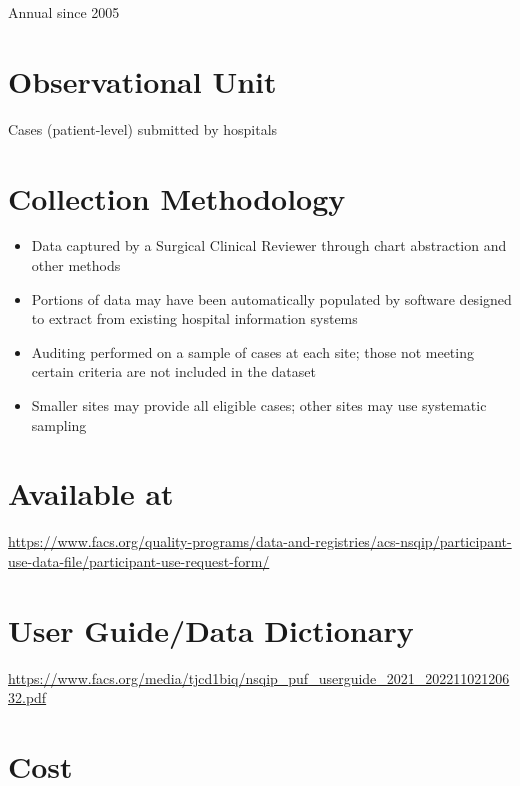 \documentclass[
]{book}
\providecommand{\tightlist}{%
  \setlength{\itemsep}{0pt}\setlength{\parskip}{0pt}}
\begin{document}
Annual since 2005

\hypertarget{observational-unit-3}{%
\section{Observational Unit}\label{observational-unit-3}}

Cases (patient-level) submitted by hospitals

\hypertarget{collection-methodology-3}{%
\section{Collection Methodology}\label{collection-methodology-3}}

\begin{itemize}
\tightlist
\item
  Data captured by a Surgical Clinical Reviewer through chart abstraction and other methods
\item
  Portions of data may have been automatically populated by software designed to extract from existing hospital information systems
\item
  Auditing performed on a sample of cases at each site; those not meeting certain criteria are not included in the dataset
\item
  Smaller sites may provide all eligible cases; other sites may use systematic sampling
\end{itemize}

\hypertarget{available-at-3}{%
\section{Available at}\label{available-at-3}}

\url{https://www.facs.org/quality-programs/data-and-registries/acs-nsqip/participant-use-data-file/participant-use-request-form/}

\hypertarget{user-guidedata-dictionary-3}{%
\section{User Guide/Data Dictionary}\label{user-guidedata-dictionary-3}}

\url{https://www.facs.org/media/tjcd1biq/nsqip_puf_userguide_2021_20221102120632.pdf}

\hypertarget{cost-3}{%
\section{Cost}\label{cost-3}}
\end{document}
